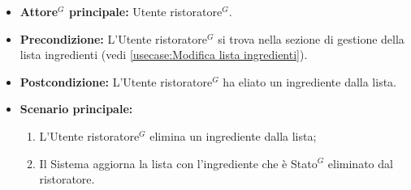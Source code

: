 \label{usecase:Eliminazione ingrediente}
\begin{itemize}

	\item \textbf{\gls{Attore}$^G$ principale:} \gls{Utente ristoratore}$^G$.

	\item \textbf{Precondizione:} L'\gls{Utente ristoratore}$^G$ si trova nella sezione di gestione della lista ingredienti (vedi \autoref{usecase:Modifica lista ingredienti}).

	\item \textbf{Postcondizione:} L'\gls{Utente ristoratore}$^G$ ha eliato un ingrediente dalla lista.

	\item \textbf{Scenario principale:}
	\begin{enumerate}
		\item L'\gls{Utente ristoratore}$^G$ elimina un ingrediente dalla lista;
		\item Il Sistema aggiorna la lista con l'ingrediente che è \gls{Stato}$^G$ eliminato dal ristoratore.
	\end{enumerate}

\end{itemize}
